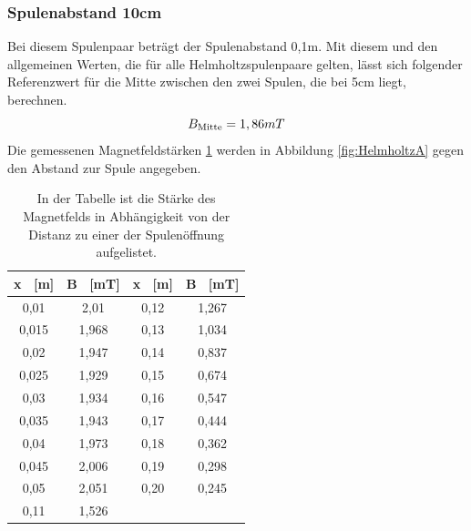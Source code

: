\documentclass[titlepage = firstcover]{scrartcl}
\begin{document}
                \subsubsection{Spulenabstand 10cm}
                Bei diesem Spulenpaar beträgt der Spulenabstand 0,1m. Mit diesem und den allgemeinen Werten, die für alle Helmholtzspulenpaare gelten, lässt 
                sich folgender Referenzwert für die Mitte zwischen den zwei Spulen, die bei 5cm liegt, berechnen.
                \begin{equation}
                    B_{\text{Mitte}} = 1,86 mT\\
                    \label{eqn:HelmA}
                \end{equation}
                Die gemessenen Magnetfeldstärken \ref{tab:HelmholtzA} werden in Abbildung \ref{fig:HelmholtzA} gegen den Abstand zur Spule angegeben.
                \begin{table}[h]
                    \centering 
                    \caption{In der Tabelle ist die Stärke des Magnetfelds in Abhängigkeit von der Distanz zu einer der Spulenöffnung aufgelistet.}
                    \label{tab:HelmholtzA}
    
                    \begin{tabular}{c c c c}
                        \toprule
                        {x \ [m]} & {B \ [mT]} & {x \ [m]} & {B \ [mT]} \\
                        \midrule
                        0,01  & 2,01  & 0,12 & 1,267 \\
                        0,015 & 1,968 & 0,13 & 1,034 \\
                        0,02  & 1,947 & 0,14 & 0,837 \\
                        0,025 & 1,929 & 0,15 & 0,674 \\
                        0,03  & 1,934 & 0,16 & 0,547 \\
                        0,035 & 1,943 & 0,17 & 0,444 \\
                        0,04  & 1,973 & 0,18 & 0,362 \\
                        0,045 & 2,006 & 0,19 & 0,298 \\
                        0,05  & 2,051 & 0,20 & 0,245 \\
                        0,11  & 1,526 & & \\
                        \bottomrule
                    \end{tabular}                
                \end{table}
    
\end{document}
